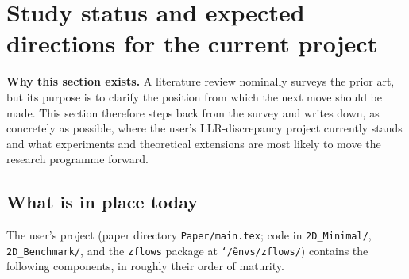 \documentclass[11pt,letterpaper]{article}
\theoremstyle{plain}
\begin{document}
\section{Study status and expected directions for the current project}

\begin{callout}
\textbf{Why this section exists.} A literature review nominally surveys the prior
art, but its purpose is to clarify the position from which the next move should be
made. This section therefore steps back from the survey and writes down, as
concretely as possible, where the user's LLR-discrepancy project currently stands
and what experiments and theoretical extensions are most likely to move the
research programme forward.
\end{callout}

\subsection{What is in place today}

The user's project (paper directory \texttt{Paper/main.tex}; code in
\texttt{2D\_Minimal/}, \texttt{2D\_Benchmark/}, and the \texttt{zflows} package at
\texttt{\char`\~/envs/zflows/}) contains the following components, in roughly
their order of maturity.
\end{document}
